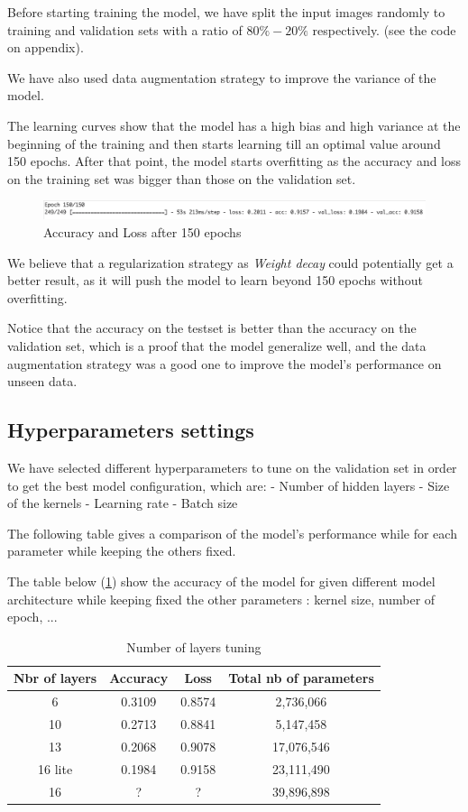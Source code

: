 \documentclass[a4paper]{article}
\begin{document}
Before starting training the model, we have split the input images randomly to training and validation sets with a ratio of $80\%-20\%$ respectively. (see the code on appendix).

We have also used data augmentation strategy to improve the variance of the model.

The learning curves show that the model has a high bias and high variance at the beginning of the training and then starts learning till an optimal value around 150 epochs. After that point, the model starts overfitting as the accuracy and loss on the training set was bigger than those on the validation set.


\begin{figure}[h!]
	\centering
	\includegraphics[scale=.5]{150epoch.png}
	\caption{Accuracy and Loss after 150 epochs}
	\label{fig:150epoch}
\end{figure}


We believe that a regularization strategy as \textit{Weight decay} could potentially get a better result, as it will push the model to learn beyond 150 epochs without overfitting.

Notice that the accuracy on the testset is better than the accuracy on the validation set, which is a proof that the model generalize well, and the data augmentation strategy was a good one to improve the model's performance on unseen data.

\subsection{Hyperparameters settings}
We have selected different hyperparameters to tune on the validation set in order to get the best model configuration, which are:
- Number of hidden layers
- Size of the kernels
- Learning rate
- Batch size

The following table gives a comparison of the model's performance while for each parameter while keeping the others fixed.

The table below (\ref{table:1}) show the accuracy of the model for given different model architecture while keeping fixed the other parameters : kernel size, number of epoch, ...

\begin{table}[h!]
	\centering
	\begin{tabular}{||c c c c||} 
		\hline
		Nbr of layers & Accuracy & Loss & Total nb of parameters\\ [0.5ex] 
		\hline\hline
		6 & 0.3109 & 0.8574 & 2,736,066\\ 
		10 & 0.2713 & 0.8841 & 5,147,458\\ 
		13 & 0.2068 & 0.9078 & 17,076,546\\ 
		16 lite & 0.1984 & 0.9158 & 23,111,490\\ 
		16 & ? & ? & 39,896,898\\  [1ex] 
		\hline
	\end{tabular}
	\caption{Number of layers tuning}
	\label{table:1}
\end{table}
\end{document}
